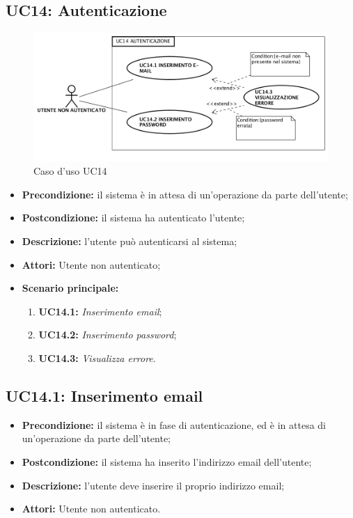 \subsection{ UC14: Autenticazione}

\begin{figure}[h]
	\begin{center}
	\includegraphics[scale=0.4]{diagram/UC14.png}
	\caption{Caso d'uso UC14}
	\end{center}
\end{figure}
\begin{itemize}
	\item \textbf{Precondizione:} il sistema è in attesa di un'operazione da parte dell'utente;
	\item \textbf{Postcondizione:} il sistema ha autenticato l'utente;
	\item \textbf{Descrizione:} l'utente può autenticarsi al sistema;
	\item \textbf{Attori:} Utente non autenticato;
	\item \textbf{Scenario principale:}
	\begin{enumerate}
		\item \textbf{ UC14.1:} \textit{ Inserimento email};
		\item \textbf{ UC14.2:} \textit{ Inserimento password};
		\item \textbf{ UC14.3:} \textit{ Visualizza errore}.
	\end{enumerate}
\end{itemize}
\subsection{ UC14.1: Inserimento email}

\begin{itemize}
	\item \textbf{Precondizione:} il sistema è in fase di autenticazione, ed è in attesa di un'operazione da parte dell'utente;
	\item \textbf{Postcondizione:} il sistema ha inserito l'indirizzo email dell'utente;
	\item \textbf{Descrizione:} l'utente deve inserire il proprio indirizzo email;
	\item \textbf{Attori:} Utente non autenticato.
\end{itemize}
